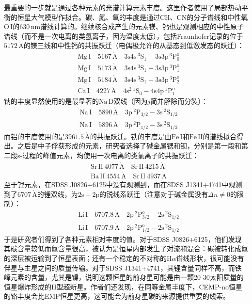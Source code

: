 \documentclass[a4paper]{article}
\begin{document}
最重要的一步就是通过各种元素的光谱计算元素丰度。这里作者使用了局部热动平衡的恒星大气模型作拟合。碳、氮、氧的丰度是通过CH、CN的分子谱线和中性氧$\mathrm{O\,I}$的$630\,\mathrm{nm}$谱线计算的。继续核合成产生的元素镁、钙也是观测相应的中性原子谱线（而不是一次电离的类氢离子，因为温度太低），包括Fraunhofer记录的位于$5172\,\mathring{\mathrm{A}}$的镁三线和中性钙的共振跃迁（电偶极允许的从基态到低激发态的跃迁）：
\begin{align*}
    & \mathrm{Mg\,I \quad 5167\,\mathring{\mathrm{A}} \quad 3s4s\,^3S_1-3s3p\,^3P_0^o} \\
    & \mathrm{Mg\,I \quad 5173\,\mathring{\mathrm{A}} \quad 3s4s\,^3S_1-3s3p\,^3P_1^o} \\
    & \mathrm{Mg\,I \quad 5184\,\mathring{\mathrm{A}} \quad 3s4s\,^3S_1-3s3p\,^3P_2^o} \\
    & \mathrm{Ca\,I \quad 4227\,\mathring{\mathrm{A}} \quad 4s^2\,^1S_0-4s4p\,^1P_1^o}
\end{align*}
钠的丰度显然使用的是最显著的$\mathrm{Na\,D}$双线（因为$j$简并解除而分裂）：
\begin{align*}
    & \mathrm{Na\,I \quad 5890\,\mathring{\mathrm{A}} \quad 3p\,^2P_{3/2}-3s\,^2S_{1/2}} \\
    & \mathrm{Na\,I \quad 5896\,\mathring{\mathrm{A}} \quad 3p\,^2P_{1/2}-3s\,^2S_{1/2}}
\end{align*}
而铝的丰度使用的是$3961.5\,\mathring{\mathrm{A}}$的共振跃迁。铁的丰度是由$\mathrm{Fe\,I}$和$\mathrm{Fe\,II}$的谱线拟合得出。之后是中子俘获形成的元素，研究者选择了碱金属锶和钡，分别是第一段和第二段s-过程的峰值元素，均使用一次电离的类氢离子的共振跃迁：
\begin{align*}
    & \mathrm{Sr\,II}\ 4077\,\mathring{\mathrm{A}} \quad \mathrm{Sr\,II}\ 4215\,\mathring{\mathrm{A}} \\
    & \mathrm{Ba\,II}\ 4554\,\mathring{\mathrm{A}} \quad \mathrm{Sr\,II}\ 4937\,\mathring{\mathrm{A}}
\end{align*}
至于锂元素，在SDSS J0826+6125中没有观测到，而在SDSS J1341+4741中观测到了$6707\,\mathring{\mathrm{A}}$的锂双线，为$\mathrm{2s-2p}$的锐线系跃迁（注意对于碱金属没有$\Delta n\neq0$的限制）：
\begin{align*}
    & \mathrm{Li\,I \quad 6707.8\,\mathring{\mathrm{A}} \quad 2p\,^2P_{3/2}^o-2s\,^2S_{1/2}} \\
    & \mathrm{Li\,I \quad 6707.9\,\mathring{\mathrm{A}} \quad 2p\,^2P_{1/2}^o-2s\,^2S_{1/2}}
\end{align*}
于是研究者们得到了各种元素相对丰度的值。对于SDSS J0826+6125，他们发现其碳含量较低而氮含量很高，被认为是恒星内部发生了对流和混合：碳被转化成氮的深层被运输到了恒星表面；还有一个稳定的不对称的$\mathrm{H}\alpha$谱线形状，很可能没有伴星与主星之间的质量传输。对于SDSS J1341+4741，其锂含量同样不高，而铁峰元素的含量，尤其是镍，说明这颗恒星的前身星可能是由一颗20-30太阳质量的恒星爆炸形成的II型超新星。作者们还发现，在同等金属丰度下，CEMP-no恒星的铬丰度会比EMP恒星更高，这可能会为前身星碳的来源提供重要的线索。
\end{document}
